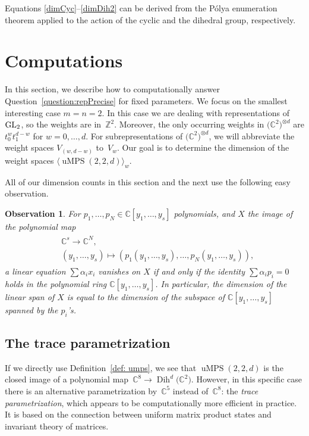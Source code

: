 \documentclass[10pt,a4paper]{amsart}
\numberwithin{equation}{section}
\newtheorem{observation}[Theorem]{Observation}
\newcommand{\ZZ}{\mathbb{Z}}
\newcommand{\CC}{\mathbb{C}}
\newcommand{\ot}{\otimes}
\DeclareMathOperator{\uMPS}{uMPS}
\DeclareMathOperator{\Dih}{Dih}
\begin{document}
Equations \eqref{dimCyc}--\eqref{dimDih2} can be derived from the P\'olya enumeration theorem \cite{polya2012combinatorial} applied to the action of the
 cyclic and the dihedral group, respectively.

  \section{Computations} \label{sec:comp}

 In this section, we describe how to computationally answer Question~\ref{question:repPrecise} for fixed parameters. We focus on the smallest interesting case $m=n=2$.
 In this case we are dealing with representations of ${\rm GL}_2$, so the weights are in~$\ZZ^2$. Moreover, the only occurring weights in $\big(\CC^2\big)^{\ot d}$ are $t_0^{w}t_1^{d-w}$ for $w=0,\dots,d$. For subrepresentations of $\big(\CC^2\big)^{\ot d}$, we will abbreviate the weight spaces $V_{(w,d-w)}$ to~$V_w$. Our goal is to determine the dimension of the weight spaces $\langle \uMPS(2,2,d) \rangle_w$.

 All of our dimension counts in this section and the next use the following easy observation.
 \begin{observation} \label{obs:dimLinSpan}
       For $p_1, \dots, p_N \in \CC[y_1,\dots,y_s]$ polynomials, and $X$ the image of the polynomial map
 \begin{gather} \label{eq:imageOfAPolynomialMap}
 \begin{split}
     & \CC^s\to \CC^N ,\\
    &  (y_1, \dots, y_s) \mapsto (p_1(y_1,\dots, y_s), \dots, p_N(y_1,\dots, y_s)),
      \end{split}
 \end{gather}
 a linear equation $\sum{\alpha_ix_i}$ vanishes on $X$ if and only if the identity $\sum{\alpha_ip_i} = 0$ holds in the polynomial ring $\CC[y_1,\dots,y_s]$. In particular, the dimension of the linear span of $X$ is equal to the dimension of the subspace of $\CC[y_1,\dots,y_s]$ spanned by the $p_i$'s.
 \end{observation}

 \subsection{The trace parametrization} If we directly use Definition~\ref{def: umps}, we see that $\uMPS(2,2,d)$ is the closed image of a polynomial map~$\CC^8 \to \Dih^d\big(\CC^2\big)$. However, in this specific case there is an alternative parametrization by~$\CC^5$ instead of~$\CC^8$: the \emph{trace parametrization}, which appears to be computationally more efficient in practice. It is based on the connection between uniform matrix product states and invariant theory of matrices.
\end{document}
